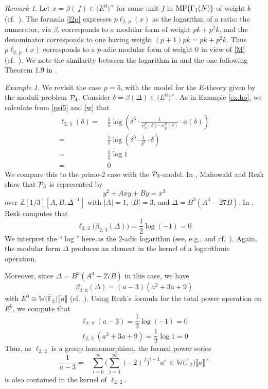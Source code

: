 \documentclass{gtpart}
\theoremstyle{definition}
\theoremstyle{remark}
\newtheorem{rmk}[equation]{Remark}
\newtheorem{ex}[equation]{Example}
\newcommand{\mb}[1]{\mathbb{#1}}
\newcommand{\cF}{\overline {\mb F}}
\newcommand{\CP}{{\cal P}}
\newcommand{\BW}{{\mb W}}
\newcommand{\BZ}{{\mb Z}}
\newcommand{\MF}{{\rm MF}}
\newcommand{\B}{\beta}
\renewcommand{\D}{\Delta}
\renewcommand{\d}{\delta}
\newcommand{\G}{\Gamma}
\newcommand{\lb}{\llbracket}
\newcommand{\rb}{\rrbracket}
\renewcommand{\=}{\approx}
\renewcommand{\-}{\sim}
\numberwithin{equation}{section}
\begin{document}
\begin{rmk}
 \label{rmk:ratio}
 Let $x = \B(\,f) \in \big( E^0 \big)^{\!\times}$ for some unit $f$ in 
 $\MF\big(\G_1(N)\big)$ of weight $k$ (cf.~\cite{KubertLang}).  The formula 
 \eqref{l2p} expresses $p \ell_{2,\,p}(x)$ as the logarithm of a ratio: the 
 numerator, via $\B$, corresponds to a modular form of weight $p k + p^2 k$, and 
 the denominator corresponds to one having weight $(p + 1) p k = p k + p^2 k$.  
 Thus $p \ell_{2,\,p}(x)$ corresponds to a $p$-adic modular form of weight 0 in 
 view of \eqref{M} (cf.~\cite[Section 10.1]{padicinterp}).  We note the 
 similarity between the logarithm in \cite[10.2.7]{padicinterp} and the one 
 following Theorem 1.9 in \cite{log}.  
\end{rmk}

\begin{ex}
 \label{ex:log}
 We revisit the case $p = 5$, with the model for the $E$-theory given by the 
 moduli problem $\CP_4$.  Consider $\d = \B(\D) \in \big( E^0 \big)^{\!\times}$.  
 As in Example \ref{ex:ho}, we calculate from \eqref{psi5} and \eqref{w} that 
 \begin{equation*}
  \begin{split}
   \ell_{2,\,5}(\d) = & ~ \frac{1}{5} \log \left( \d^5 \cdot 
                        \frac{1}{\psi^p_0(\d) \cdots \psi^p_p(\d)} \cdot 
                        \phi(\d) \right) \\
                    = & ~ \frac{1}{5} \log \left( \d^5 \cdot \frac{1}{\d^6} 
                        \cdot \d \right) \\
                    = & ~ \frac{1}{5} \log 1 \\
                    = & ~ 0 
  \end{split}
 \end{equation*}
 We compare this to the prime-2 case with the $\CP_3$-model.  In 
 \cite[Proposition 3.2]{tmf3}, Mahowald and Rezk show that $\CP_3$ is 
 represented by 
 \[
  y^2 + A x y + B y = x^3 
 \]
 over $\BZ[1/3][A, B, \D^{-1}]$ with $|A| = 1$, $|B| = 3$, and 
 $\D = B^3 (A^3 - 27 B)$.  In \cite[2.8]{h2p2}, Rezk computes that 
 \[
  \ell_{2,\,2}\big(\B_{2,\,3}(\D)\big) = \frac{1}{2} \log(-1) = 0 
 \]
 We interpret the ``$\log$'' here as the 2-adic logarithm (see, e.g., 
 \cite[\S IV.1]{padic} and cf.~\cite[10.2.16]{padicinterp}).  Again, the modular 
 form $\D$ produces an element in the kernel of a logarithmic operation.  

 Moreover, since $\D = B^3 (A^3 - 27 B)$ in this case, we have 
 \[
  \B_{2,\,3}(\D) = (a - 3) (a^2 + 3 a + 9) 
 \]
 with $E^0 \cong \BW \big( \cF_2 \big) \lb a \rb$ (cf.~\cite[Section 4]{h2p2}).  
 Using Rezk's formula for the total power operation on $E^0$, we compute that 
 \[
  \ell_{2,\,2}(a - 3) = \frac{1}{2} \log(-1) = 0 
 \]
 \[
  \ell_{2,\,2}(a^2 + 3 a + 9) = \frac{1}{2} \log 1 = 0 
 \]
 Thus, as $\ell_{2,\,2}$ is a group homomorphism, the formal power series 
 \[
  \frac{1}{a - 3} = -\sum_{i = 0}^\infty 
                    \Big( \sum_{j = 0}^\infty (-2)^{\,j} \Big)^{\!i + 1} a^i ~ 
                    \in \BW \big( \cF_2 \big) \lb a \rb^\times 
 \]
 is also contained in the kernel of $\ell_{2,\,2}$.  


\end{ex}
\end{document}
